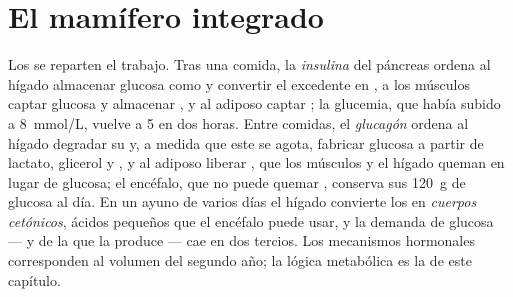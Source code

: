 \section{El mamífero integrado}

\begin{proposition}\label{prop:b1:biosyntheses-integration:fedfasting}
Los  se reparten el trabajo. Tras una comida, la \emph{insulina} del
páncreas ordena al hígado almacenar glucosa como  y convertir el
excedente en , a los músculos captar glucosa y almacenar , y
al  adiposo captar ; la glucemia, que había subido a
\qty{8}{mmol/L}, vuelve a \qty{5}{} en dos horas. Entre comidas, el
\emph{glucagón} ordena al hígado degradar su  y, a medida que este
se agota, fabricar glucosa a partir de lactato, glicerol y , y al
 adiposo liberar , que los músculos y el hígado queman en
lugar de glucosa; el encéfalo, que no puede quemar , conserva sus
\qty{120}{g} de glucosa al día. En un ayuno de varios días el hígado
convierte los  en \emph{cuerpos cetónicos}, ácidos pequeños que
el encéfalo puede usar, y la demanda de glucosa --- y de la  que la
produce --- cae en dos tercios. Los mecanismos hormonales corresponden al
volumen del segundo año; la lógica metabólica es la de este capítulo.
\end{proposition}


